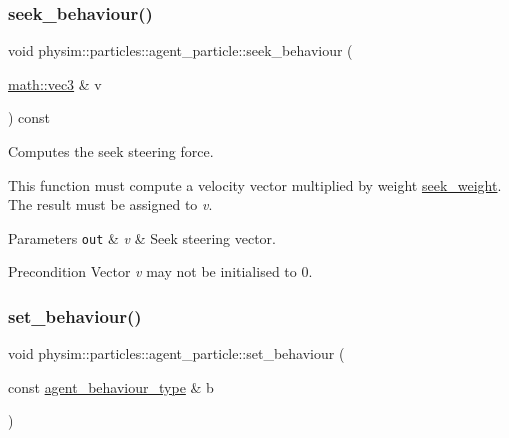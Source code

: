 \subsubsection{\texorpdfstring{seek\+\_\+behaviour()}{seek\_behaviour()}}
{\footnotesize\ttfamily void physim\+::particles\+::agent\+\_\+particle\+::seek\+\_\+behaviour (\begin{DoxyParamCaption}\item[{\hyperlink{structphysim_1_1math_1_1vec3}{math\+::vec3} \&}]{v }\end{DoxyParamCaption}) const\hspace{0.3cm}{\ttfamily [virtual]}}



Computes the seek steering force. 

This function must compute a velocity vector multiplied by weight \hyperlink{classphysim_1_1particles_1_1agent__particle_a853c72c7dbd902a126af1a90d50af222}{seek\+\_\+weight}. The result must be assigned to {\itshape v}.


\begin{DoxyParams}[1]{Parameters}
\mbox{\tt out}  & {\em v} & Seek steering vector. \\
\hline
\end{DoxyParams}
\begin{DoxyPrecond}{Precondition}
Vector {\itshape v} may not be initialised to 0. 
\end{DoxyPrecond}
\mbox{\label{classphysim_1_1particles_1_1agent__particle_a5eeac79c256570806270b4de1907396f}} 
\subsubsection{\texorpdfstring{set\+\_\+behaviour()}{set\_behaviour()}}
{\footnotesize\ttfamily void physim\+::particles\+::agent\+\_\+particle\+::set\+\_\+behaviour (\begin{DoxyParamCaption}\item[{const \hyperlink{namespacephysim_1_1particles_a033757595f7862a0fc8a389d79bf9c88}{agent\+\_\+behaviour\+\_\+type} \&}]{b }\end{DoxyParamCaption})}



